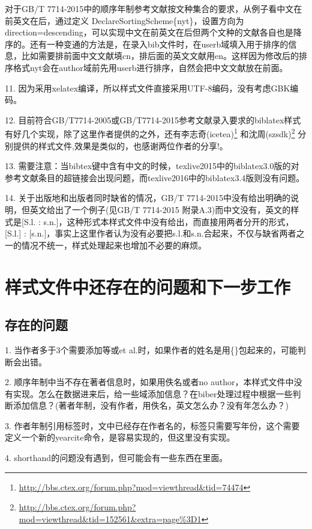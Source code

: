 \documentclass[11pt]{article} %
\begin{document}
对于GB/T 7714-2015中的顺序年制参考文献按文种集合的要求，从例子看中文在前英文在后，通过定义
DeclareSortingScheme\{nyt\}，设置方向为direction=descending，可以实现中文在前英文在后但两个文种的文献各自也是降序的。还有一种变通的方法是，在录入bib文件时，在userb域填入用于排序的信息，比如需要排前面中文文献填cn，排后面的英文文献用en。这样因为修改后的排序格式nyt会在author域前先用userb进行排序，自然会把中文文献放在前面。

11. 因为采用xelatex编译，所以样式文件直接采用UTF-8编码，没有考虑GBK编码。

12. 目前符合GB/T7714-2005或GB/T7714-2015参考文献录入要求的biblatex样式有好几个实现，除了这里作者提供的之外，还有李志奇(icetea)\footnote{\url{http://bbs.ctex.org/forum.php?mod=viewthread&tid=74474}} 和沈周(szsdk)\footnote{\url{http://bbs.ctex.org/forum.php?mod=viewthread&tid=152561&extra=page\%3D1}} 分别提供的样式文件,效果是类似的，也感谢两位作者的分享!。

13. 需要注意：当bibtex键中含有中文的时候，texlive2015中的biblatex3.0版的对参考文献条目的超链接会出现问题，而texlive2016中的biblatex3.4版则没有问题。

14. 关于出版地和出版者同时缺省的情况，GB/T 7714-2015中没有给出明确的说明，但英文给出了一个例子(见GB/T 7714-2015 附录A.3)而中文没有，英文的样式是[S.l. : s.n.]，这种形式本样式文件中没有给出，而直接用两者分开的形式，[S.l.] : [s.n.]，事实上这里作者认为没有必要把s.l.和s.n.合起来，不仅与缺省两者之一的情况不统一，样式处理起来也增加不必要的麻烦。

\section{样式文件中还存在的问题和下一步工作}
\subsection{存在的问题}

1. 当作者多于3个需要添加等或et al.时，如果作者的姓名是用\{\}包起来的，可能判断会出错。

2. 顺序年制中当不存在著者信息时，如果用佚名或者no author，本样式文件中没有实现。怎么在数据进来后，给一些域添加信息？在biber处理过程中根据一些判断添加信息？(著者年制，没有作者，用佚名，英文怎么办？没有年怎么办？)

3. 作者年制引用标签时，文中已经存在作者名的，标签只需要写年份，这个需要定义一个新的yearcite命令，是容易实现的，但这里没有实现。

4. shorthand的问题没有遇到，但可能会有一些东西在里面。
\end{document}
